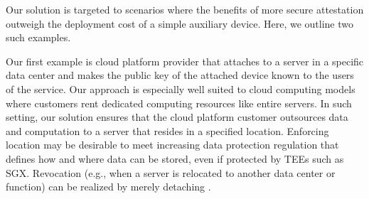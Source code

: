 
Our solution is targeted to scenarios where the benefits of more secure attestation outweigh the deployment cost of a simple auxiliary device. Here, we outline two such examples.  


  Our first example is cloud platform provider that attaches \device to a server in a specific data center and makes the public key of the attached device known to the users of the service. Our approach is especially well suited to cloud computing models where customers rent dedicated computing resources like entire servers. In such setting, our solution ensures that the cloud platform customer outsources data and computation to a server that resides in a specified location. Enforcing location may be desirable to meet increasing data protection regulation that defines how and where data can be stored, even if protected by TEEs such as SGX. Revocation (e.g., when a server is relocated to another data center or function) can be realized by merely detaching \device.


